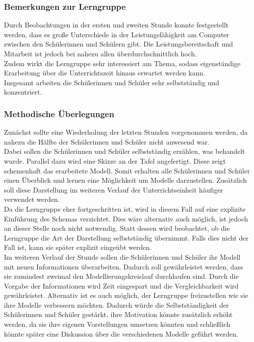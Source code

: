 \subsubsection{Bemerkungen zur Lerngruppe}
Durch Beobachtungen in der ersten und zweiten Stunde konnte festgestellt werden, dass es große Unterschiede in der Leistungsfähigkeit am Computer zwischen den Schülerinnen und Schülern gibt. Die Leistungsbereitschaft und Mitarbeit ist jedoch bei nahezu allen überdurchschnittlich hoch.\\ Zudem wirkt die Lerngruppe sehr interessiert am Thema, sodass eigenständige Erarbeitung über die Unterrichtszeit hinaus erwartet werden kann.\\
  Insgesamt arbeiten die Schülerinnen und Schüler sehr selbstständig und konzentriert. 
\subsubsection{Methodische Überlegungen}
Zunächst sollte eine Wiederholung der letzten Stunden vorgenommen werden, da nahezu die Hälfte der Schülerinnen und Schüler nicht anwesend war.\\
Dabei sollen die Schülerinnen und Schüler selbstständig erzählen, was behandelt wurde. Parallel dazu wird eine Skizze an der Tafel angefertigt. Diese zeigt schemenhaft das erarbeitete Modell. Somit erhalten alle Schülerinnen und Schüler einen Überblick und lernen eine Möglichkeit um Modelle darzustellen. Zusätzlich soll diese Darstellung im weiteren Verlauf der Unterrichtseinheit häufiger verwendet werden.\\
Da die Lerngruppe eher fortgeschritten ist, wird in diesem Fall auf eine explizite Einführung des Schemas verzichtet. Dies wäre alternativ auch möglich, ist jedoch an dieser Stelle noch nicht notwendig. Statt dessen wird beobachtet, ob die Lerngruppe die Art der Darstellung selbstständig übernimmt. Falls dies nicht der Fall ist, kann sie später explizit eingeübt werden.\\
Im weiteren Verlauf der Stunde sollen die Schülerinnen und Schüler ihr Modell mit neuen Informationen überarbeiten. Dadurch soll gewährleistet werden, dass sie zumindest zweimal den Modellierungskreislauf durchlaufen sind. Durch die Vorgabe der Informationen wird Zeit eingespart und die Vergleichbarkeit wird gewährleistet. Alternativ ist es auch möglich, der Lerngruppe freizustellen wie sie ihre Modelle verbessern möchten. Dadurch würde die Selbstständigkeit der Schülerinnen und Schüler gestärkt, ihre Motivation könnte zusätzlich erhöht werden, da sie ihre eigenen Vorstellungen umsetzen könnten und schließlich könnte später eine Diskussion über die verschiedenen Modelle geführt werden.\\

